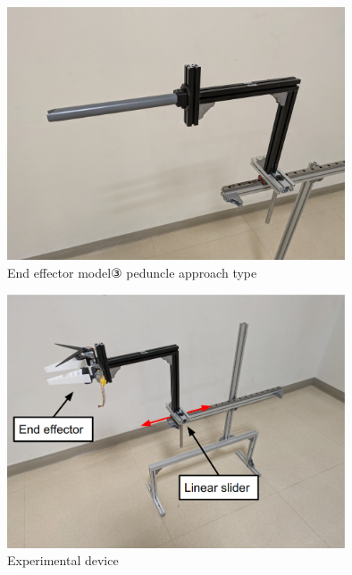 \begin{figure}[H]
    \centering
    \includegraphics[width=100mm]{images/png/agrist_model.png}
    \caption{End effector model③ peduncle approach type}
    \label{Fig:agristmodel}
   \end{figure}

\begin{figure}[H]
    \centering
    \includegraphics[width=100mm]{images/png/device.png}
    \caption{Experimental device}
    \label{Fig:device}
   \end{figure}
